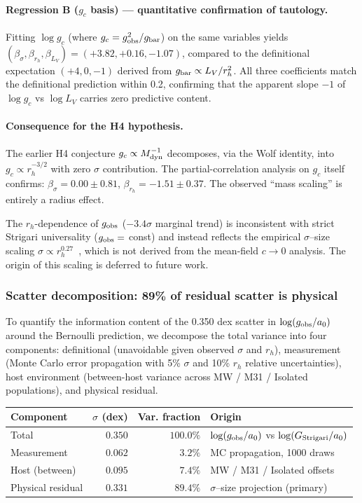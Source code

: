 \documentclass[11pt,a4paper]{article}
\newcommand{\gobs}{g_{\rm obs}}
\newcommand{\gbar}{g_{\rm bar}}
\newcommand{\gc}{g_{c}}
\newcommand{\ao}{a_{0}}
\newcommand{\rh}{r_{h}}
\newcommand{\LV}{L_{V}}
\newcommand{\Mdyn}{M_{\rm dyn}}
\newcommand{\Gstr}{G_{\rm Strigari}}
\begin{document}
\paragraph{Regression B ($\gc$ basis) --- quantitative confirmation of tautology.}
Fitting $\log\gc$ (where $\gc = \gobs^2/\gbar$) on the same variables yields
$(\beta_\sigma, \beta_{\rh}, \beta_{\LV}) = (+3.82, +0.16, -1.07)$, compared to the definitional expectation
$(+4, 0, -1)$ derived from $\gbar \propto \LV/\rh^2$. All three coefficients match the definitional
prediction within 0.2, confirming that the apparent slope $-1$ of $\log\gc$ vs $\log\LV$ carries zero
predictive content.

\paragraph{Consequence for the H4 hypothesis.}
The earlier H4 conjecture $\gc \propto \Mdyn^{-1}$ decomposes, via the Wolf identity, into $\gc \propto
\rh^{-3/2}$ with zero $\sigma$ contribution. The partial-correlation analysis on $\gc$ itself confirms:
$\beta_\sigma = 0.00 \pm 0.81$, $\beta_{\rh} = -1.51 \pm 0.37$. The observed ``mass scaling'' is entirely a
radius effect.

The $\rh$-dependence of $\gobs$ ($-3.4\sigma$ marginal trend) is inconsistent with strict Strigari
universality ($\gobs = $ const) and instead reflects the empirical $\sigma$--size scaling $\sigma \propto
\rh^{0.27}$~\citep{Brasseur2011, McConnachie2012}, which is not derived from the mean-field $c \to 0$
analysis. The origin of this scaling is deferred to future work.

\subsubsection{Scatter decomposition: 89\% of residual scatter is physical}
To quantify the information content of the 0.350 dex scatter in $\log(\gobs/\ao)$ around the Bernoulli
prediction, we decompose the total variance into four components: definitional (unavoidable given observed
$\sigma$ and $\rh$), measurement (Monte Carlo error propagation with 5\% $\sigma$ and 10\% $\rh$ relative
uncertainties), host environment (between-host variance across MW / M31 / Isolated populations), and
physical residual.

\begin{center}\small
\begin{tabular}{@{}lrrl@{}}
\toprule
Component & $\sigma$ (dex) & Var. fraction & Origin \\
\midrule
Total & $0.350$ & $100.0\%$ & $\log(\gobs/\ao)$ vs $\log(\Gstr/\ao)$ \\
Measurement & $0.062$ & $3.2\%$ & MC propagation, 1000 draws \\
Host (between) & $0.095$ & $7.4\%$ & MW / M31 / Isolated offsets \\
Physical residual & $0.331$ & $89.4\%$ & $\sigma$--size projection (primary) \\
\bottomrule
\end{tabular}
\end{center}
\end{document}

